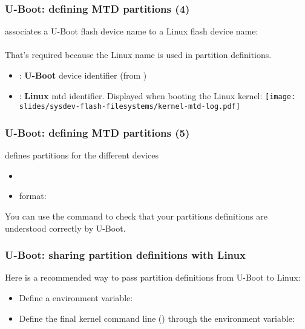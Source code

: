 \begin{frame}[fragile]
  \frametitle{U-Boot: defining MTD partitions (4)}
   associates a U-Boot flash device name
  to a Linux flash device name:\\
  \\
  \vspace{0.5cm}
  That's required because the Linux name is used in partition definitions.
  \begin{itemize}
  \item {}: {\bf U-Boot} device identifier (from )
  \item {}: {\bf Linux} mtd identifier. Displayed
    when booting the Linux kernel:
    \texttt{[image: slides/sysdev-flash-filesystems/kernel-mtd-log.pdf]}\\
  \end{itemize}
\end{frame}

\begin{frame}[fragile]
  \frametitle{U-Boot: defining MTD partitions (5)}
   defines partitions for the different devices\\
  \begin{itemize}
    \item {}
    \item {} format: 
  \end{itemize}
  You can use the  command to check that your partitions
  definitions are understood correctly by U-Boot.
\end{frame}

\begin{frame}
  \frametitle{U-Boot: sharing partition definitions with Linux}
  Here is a recommended way to pass partition definitions from U-Boot to Linux:
  \begin{itemize}
  \item Define a  environment variable:\\
  \item Define the final kernel command line ()
    through the  environment variable:
  \end{itemize}
\end{frame}

